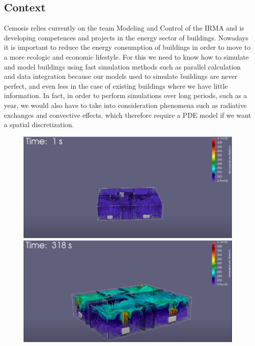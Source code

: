 \documentclass[12pt]{article}
\begin{document}
	\subsection{Context}
	\noindent Cemosis relies currently on the team Modeling and Control of the IRMA and is developing competences and projects in the energy sector of buildings. Nowadays it is important to reduce the energy consumption of buildings in order to move to a more ecologic and economic lifestyle. For this we need to know how to simulate and model buildings using fast simulation methods such as parallel calculation and data integration because our models used to simulate buildings are never perfect, and even less in the case of existing buildings where we have little information. In fact, in order to perform simulations over long periods, such as a year, we would also have to take into consideration phenomena such as radiative exchanges and convective effects, which therefore require a PDE model if we want a spatial discretization.
	\begin{figure}[H]       
	\begin{minipage}[t]{0.48\linewidth}
		\centering
		\includegraphics[width=\linewidth]{"images/cemosis_simulation_1.png"}
	\end{minipage} \hfill
	\begin{minipage}[t]{0.48\linewidth}
		\centering
		\includegraphics[width=\linewidth]{"images/cemosis_simulation_2.png"}
	\end{minipage}
    \end{figure}
	
\end{document}
